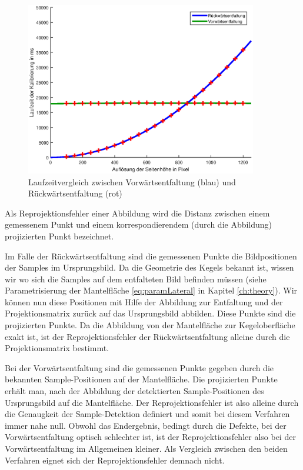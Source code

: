 \begin{figure}[!htb]
	\centering
	\includegraphics[width=0.9\textwidth]{images/runningTimeCalibration.eps}
	\caption{Laufzeitvergleich zwischen Vorwärtsentfaltung (blau) und Rückwärtsentfaltung (rot)}
	\label{fig:runningTimeComparision}
\end{figure}


\bigskip

Als Reprojektionsfehler einer Abbildung wird die Distanz zwischen einem gemessenem Punkt und einem korrespondierendem (durch die Abbildung) projizierten Punkt bezeichnet.


Im Falle der Rückwärtsentfaltung sind die gemessenen Punkte die Bildpositionen der Samples im Ursprungsbild. Da die Geometrie des Kegels bekannt ist, wissen wir wo sich die  Samples auf dem entfalteten Bild befinden müssen (siehe Parametrisierung der Mantelfläche \ref{eq:paramLateral} in Kapitel \ref{ch:theory}). Wir können nun diese Positionen mit Hilfe der Abbildung zur Entfaltung und der Projektionsmatrix zurück auf das Ursprungsbild abbilden. Diese Punkte sind die projizierten Punkte. Da die Abbildung von der Mantelfläche zur Kegeloberfläche exakt ist, ist der Reprojektionsfehler der Rückwärtsentfaltung alleine durch die Projektionsmatrix bestimmt.

Bei der Vorwärtsentfaltung sind die gemessenen Punkte gegeben durch die bekannten Sample-Positionen auf der Mantelfläche. Die projizierten Punkte erhält man, nach der Abbildung der detektierten Sample-Positionen des Ursprungsbild auf die Mantelfläche. Der Reprojektionsfehler ist also alleine durch die Genaugkeit der Sample-Detektion definiert und somit bei diesem Verfahren immer nahe null.
Obwohl das Endergebnis, bedingt durch die Defekte, bei der Vorwärtsentfaltung optisch schlechter ist, ist der Reprojektionsfehler also bei der Vorwärtsentfaltung im Allgemeinen kleiner.
Als Vergleich zwischen den beiden Verfahren eignet sich der Reprojektionsfehler demnach nicht.

